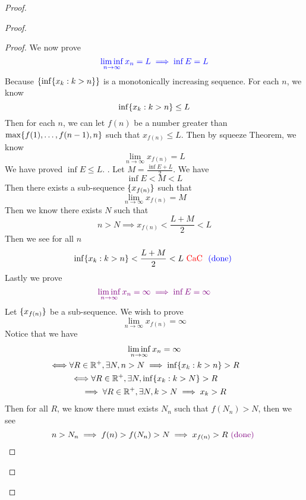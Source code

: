 \documentclass{report}
\begin{document}
\begin{proof}
\begin{proof}
\begin{proof}
We now prove 
\begin{equation}
\textcolor{blue}{\liminf_{n\to\infty} x_n=L \implies \inf E=L}
\end{equation}
Because $\{ \inf \{ x_k:k>n \} \}$ is a monotonically increasing sequence. For each $n$, we know
\begin{equation}
\inf \{ x_k:k>n \}\leq L
\end{equation}
Then for each $n$, we can let  $f(n)$ be a number greater than $\max \{ f(1),\dots ,f(n-1),n \}$ such that $x_{f(n)}\leq L$. Then by squeeze Theorem, we know 
\begin{equation}
\lim_{n\to\infty}x_{f(n)}=L
\end{equation}
We have proved $\inf E\leq L$. . Let $M=\frac{\inf E+L}{2}$. We have
\begin{equation}
\inf E<M<L
\end{equation}
Then there exists a sub-sequence $\{ x_{f(n)} \}$ such that
\begin{equation}
\lim_{n\to\infty}x_{f(n)}=M
\end{equation}
Then we know there exists $N$ such that
 \begin{equation}
n>N\implies x_{f(n)}<\frac{L+M}{2}<L
\end{equation}
Then we see for all $n$
\begin{equation}
\inf \{ x_k:k>n \}<\frac{L+M}{2}<L\text{ \textcolor{red}{CaC} }\textcolor{blue}{\text{ (done) }}
\end{equation}
Lastly we prove 
\begin{equation}
  \textcolor{violet}{\liminf_{n\to\infty} x_n=\infty\implies \inf E=\infty}
\end{equation}
Let $\{ x_{f(n)} \}$ be a sub-sequence. We wish to prove
\begin{equation}
\lim_{n\to\infty} x_{f(n)}=\infty
\end{equation}
Notice that we have
\begin{gather}
\liminf_{n\to\infty} x_n=\infty\\
\liff \forall R\inr^+ ,\exists N, n>N\implies \inf \set{x_k:k>n}>R\\
\liff  \forall R\inr^+,\exists N, \inf \set{x_k:k>N}>R\\
\implies  \forall R\inr^+,\exists N, k>N\implies x_k>R
\end{gather}
Then for all $R$, we know there must exists  $N_n$ such that  $f(N_n)>N$, then we see 
\begin{equation}
n>N_n\implies f(n)>f(N_n)>N\implies x_{f(n)}>R \textcolor{violet}{\text{ (done) }}
\end{equation}
\end{proof}

\end{proof}
\end{proof}
\end{document}

